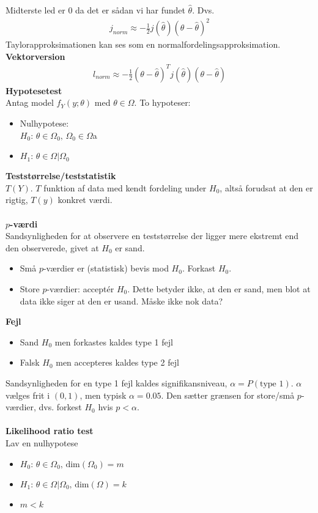 \documentclass[12pt,a4paper]{report}
\begin{document}
Midterste led er 0 da det er sådan vi har fundet $\hat{\theta}$. Dvs.
\begin{align*}
j_{norm}\approx-\frac{1}{2}j(\hat{\theta})(\theta-\hat{\theta})^2
\end{align*}
Taylorapproksimationen kan ses som en normalfordelingsapproksimation.
\textbf{Vektorversion}
\begin{align*}
l_{norm}\approx-\frac{1}{2}(\theta-\hat{\theta})^Tj(\hat{\theta})(\theta-\hat{\theta})
\end{align*}
\textbf{Hypotesetest}\\
Antag model $f_Y(y;\theta)$ med $\theta\in\Omega$. To hypoteser:
\begin{itemize}
\item Nulhypotese:\\$H_0:\,\theta\in\Omega_0,\,\Omega_0\in\Omega$a
\item $H_1:\,\theta\in\Omega|\Omega_0$
\end{itemize}
\textbf{Teststørrelse/teststatistik}\\
$T(Y)$. $T$ funktion af data med kendt fordeling under $H_0$, altså forudsat at den er rigtig, $T(y)$ konkret værdi.\\\\
\textbf{$p$-værdi}\\
Sandsynligheden for at observere en teststørrelse der ligger mere ekstremt end den observerede, givet at $H_0$ er sand.
\begin{itemize}
\item Små $p$-værdier er (statistisk) bevis mod $H_0$. Forkast $H_0$.
\item Store $p$-værdier: acceptér $H_0$. Dette betyder ikke, at den er sand, men blot at data ikke siger at den er usand. Måske ikke nok data?
\end{itemize}
\textbf{Fejl}
\begin{itemize}
\item Sand $H_0$ men forkastes kaldes type 1 fejl
\item Falsk $H_0$ men accepteres kaldes type 2 fejl
\end{itemize}
Sandsynligheden for en type 1 fejl kaldes signifikansniveau, $\alpha=P(\text{type 1})$. $\alpha$ vælges frit i $(0,1)$, men typisk $\alpha=0.05$. Den sætter grænsen for store/små $p$-værdier, dvs. forkest $H_0$ hvis $p<\alpha$.\\\\
\textbf{Likelihood ratio test}\\
Lav en nulhypotese
\begin{itemize}
\item $H_0:\,\theta\in\Omega_0,\,\text{dim}(\Omega_0)=m$
\item $H_1:\,\theta\in\Omega|\Omega_0,\,\text{dim}(\Omega)=k$
\item $m<k$
\end{itemize}
\end{document}
